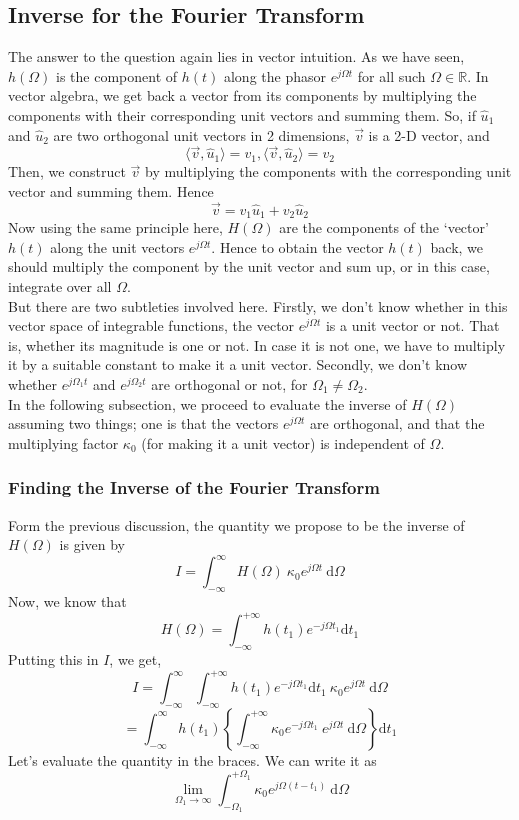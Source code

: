 \subsection{Inverse for the Fourier Transform}
The answer to the question again lies in vector intuition. As we have seen, $h(\Omega)$ is the component of $h(t)$ along the phasor $e^{j\Omega t}$ for all such $\Omega \in \mathbb{R}$. In vector algebra, we get back a vector from its components by multiplying the components with their corresponding unit vectors and summing them. So, if $\hat{u}_1$ and $\hat{u}_2$ are two orthogonal unit vectors in 2 dimensions, $\overrightarrow{v}$ is a 2-D vector, and
\[
\langle \overrightarrow{v},\hat{u}_1 \rangle = v_1, \langle \overrightarrow{v},\hat{u}_2 \rangle = v_2
\]
Then, we construct $\overrightarrow{v}$ by multiplying the components with the corresponding unit vector and summing them. Hence
\[
\overrightarrow{v} = v_1\hat{u}_1 + v_2\hat{u}_2
\]
Now using the same principle here, $H(\Omega)$ are the components of the `vector' $h(t)$ along the unit vectors $e^{j\Omega t}$. Hence to obtain the vector $h(t)$ back, we should multiply the component by the unit vector and sum up, or in this case, integrate over all $\Omega$.\\
But there are two subtleties involved here. Firstly, we don't know whether in this vector space of integrable functions, the vector $e^{j\Omega t}$ is a unit vector or not. That is, whether its magnitude is one or not. In case it is not one, we have to multiply it by a suitable constant to make it a unit vector. Secondly, we don't know whether $e^{j\Omega_1 t}$ and $e^{j\Omega_2 t}$ are orthogonal or not, for $\Omega_1 \neq \Omega_2$.\\
In the following subsection, we proceed to evaluate the inverse of $H(\Omega)$ assuming two things; one is that the vectors $e^{j\Omega t}$ are orthogonal, and that the multiplying factor $\kappa_0$ (for making it a unit vector) is independent of $\Omega$.
\subsubsection{Finding the Inverse of the Fourier Transform}
Form the previous discussion, the quantity we propose to be the inverse of $H(\Omega)$ is given by
\[
I = \int_{-\infty}^{\infty} \! H(\Omega)\ \kappa_0 e^{j\Omega t} \ \mathrm{d}\Omega
\]
Now, we know that
\[
H(\Omega)= \int_{-\infty}^{+\infty}h(t_1)e^{-j\Omega t_1}\mathrm{d}t_1
\]
Putting this in $I$, we get,
\[
I = \int_{-\infty}^{\infty} \! \int_{-\infty}^{+\infty}h(t_1)e^{-j\Omega t_1}\mathrm{d}t_1 \ \kappa_0 e^{j\Omega t} \ \mathrm{d}\Omega
\]
\[
= \int_{-\infty}^{\infty} \! h(t_1) \left\lbrace \int_{-\infty}^{+\infty} \! \kappa_0 e^{-j\Omega t_1} \  e^{j\Omega t} \ \mathrm{d}\Omega \right\rbrace \mathrm{d}t_1
\]
Let's evaluate the quantity in the braces. We can write it as
\[
\lim_{\Omega_1 \to \infty} \int_{-\Omega_1}^{+\Omega_1} \! \kappa_0 e^{j\Omega (t-t_1)} \ \mathrm{d}\Omega
\]

